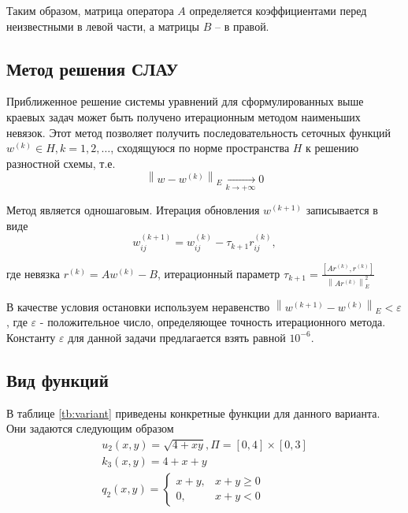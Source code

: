 \documentclass[12pt, fleqn]{article}
\theoremstyle{definition}
\begin{document}
Таким образом, матрица оператора $A$ определяется коэффициентами перед неизвестными в левой части, а матрицы $B$ -- в правой.

\subsection{Метод решения СЛАУ}
Приближенное решение системы уравнений для сформулированных выше краевых задач может быть получено итерационным методом наименьших невязок. Этот метод позволяет получить последовательность сеточных функций $w^{(k)} \in H, k=1,2, \ldots$, сходящуюся по норме пространства $H$ к решению разностной схемы, т.е.
\abovedisplayskip=1pt
\belowdisplayskip=2pt
\noindent
$$
\left\|w-w^{(k)}\right\|_{E} \xrightarrow[k \rightarrow+\infty]{} 0
$$

Метод является одношаговым. Итерация обновления $w^{(k+1)}$ записывается в виде
\abovedisplayskip=1pt
\belowdisplayskip=2pt
\noindent
$$
w_{i j}^{(k+1)}=w_{i j}^{(k)}-\tau_{k+1} r_{i j}^{(k)},
$$

где невязка $r^{(k)}=A w^{(k)}-B$, итерационный параметр
$
\tau_{k+1}=\frac{\left[A r^{(k)}, r^{(k)}\right]}{\left\|A r^{(k)}\right\|_{E}^{2}}
$

В качестве условия остановки используем неравенство
$
\left\|w^{(k+1)}-w^{(k)}\right\|_{E}<\varepsilon
$, где $\varepsilon$ - положительное число, определяющее точность итерационного метода.  Константу $\varepsilon$ для данной задачи предлагается взять равной $10^{-6}$.

\subsection{Вид функций}
В таблице \ref{tb:variant} приведены конкретные функции для данного варианта. Они задаются следующим образом
\abovedisplayskip=1pt
\belowdisplayskip=2pt
\noindent
\begin{gather}
 u_{2}(x, y)=\sqrt{4+x y}, \Pi=[0,4] \times[0,3] \label{eq:u_func}\\
 k_{3}(x, y)=4+x+y \label{eq:k_func}\\
 q_{2}(x, y)=\begin{cases}
              x+y, & x+y \geqslant 0\\
              0, &x+y < 0
             \end{cases} \label{eq:q_func}
\end{gather}
\end{document}
